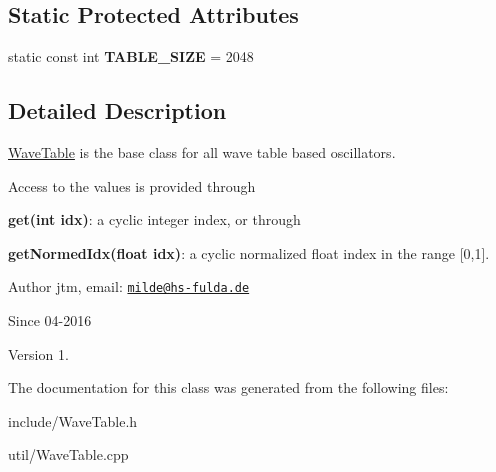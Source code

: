 \subsection*{Static Protected Attributes}
\begin{DoxyCompactItemize}
\item 
static const int {\bfseries T\+A\+B\+L\+E\+\_\+\+S\+I\+ZE} = 2048\hypertarget{classWaveTable_ae8fe89b58ec31a5beda1bfc79d1c39ad}{}\label{classWaveTable_ae8fe89b58ec31a5beda1bfc79d1c39ad}

\end{DoxyCompactItemize}


\subsection{Detailed Description}
\hyperlink{classWaveTable}{Wave\+Table} is the base class for all wave table based oscillators.

Access to the values is provided through


\begin{DoxyItemize}
\item {\bfseries get(int idx)}\+: a cyclic integer index, or through
\item {\bfseries get\+Normed\+Idx(float idx)}\+: a cyclic normalized float index in the range \mbox{[}0,1\mbox{]}.
\end{DoxyItemize}

\begin{DoxyAuthor}{Author}
jtm, email\+:  \href{mailto:milde@hs-fulda.de}{\tt milde@hs-\/fulda.\+de} 
\end{DoxyAuthor}
\begin{DoxySince}{Since}
04-\/2016 
\end{DoxySince}
\begin{DoxyVersion}{Version}
1. 
\end{DoxyVersion}


The documentation for this class was generated from the following files\+:\begin{DoxyCompactItemize}
\item 
include/Wave\+Table.\+h\item 
util/Wave\+Table.\+cpp\end{DoxyCompactItemize}
